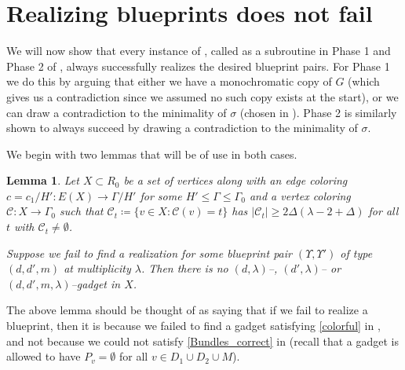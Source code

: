 \documentclass{article}
\newcommand{\cC}{\mathcal{C} }
\newtheorem{lemma}[theorem]{Lemma}
\theoremstyle{definition}
\begin{document}
\section{Realizing blueprints does not fail}\label{sec.nofail}

We will now show that every instance of , called as a subroutine in Phase 1 and Phase 2 of , always successfully realizes the desired blueprint pairs. For Phase 1 we do this by arguing that either we have a monochromatic copy of $G$ (which gives us a contradiction since we assumed no such copy exists at the start), or we can draw a contradiction to the minimality of $\sigma$ (chosen in ). Phase 2 is  similarly  shown to always succeed by drawing a contradiction to the minimality of $\sigma$.

We begin with two lemmas that will be of use in both cases.

\begin{lemma}\label{prelim_phase_arg}
    Let $X\subset R_0$ be a set of vertices along with an edge coloring $c=c_1/H':E(X)\to \Gamma/H'$ for some $H'\leqslant \Gamma\leqslant\Gamma_0$ and a vertex coloring $\cC:X\to \Gamma_0$ such that $\cC_t\coloneqq \{v\in X:\cC(v)=t\}$ has $|\cC_t|\geq 2\Delta(\lambda-2+\Delta)$ for all $t$ with $\cC_t\neq \emptyset$. 
    
    Suppose we fail to find a realization for some blueprint pair $(\Upsilon,\Upsilon')$ of type $(d, d', m)$ at multiplicity $\lambda$. Then there is no $(d,\lambda)$--,  $(d',\lambda)$-- or $(d,d',m,\lambda)$--gadget in $X$.
\end{lemma}

The above lemma should be thought of as saying that if we fail to realize a blueprint, then it is because we failed to find a gadget satisfying \cref{colorful} in , and not because we could not satisfy \cref{Bundles_correct} in  (recall that a gadget is allowed to have $P_v=\emptyset$ for all $v\in D_1\cup D_2\cup M$).
\end{document}
